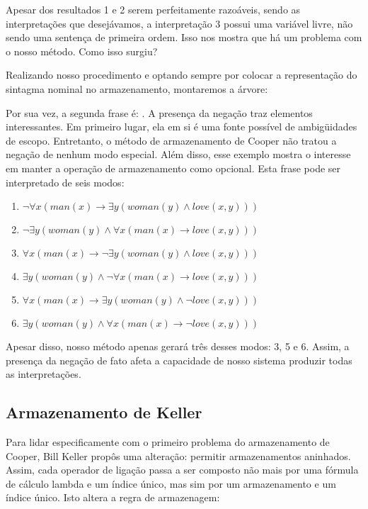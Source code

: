 Apesar dos resultados 1 e 2 serem perfeitamente razoáveis, sendo as interpretações que desejávamos, a interpretação 3 possui uma variável livre, não sendo uma sentença de primeira ordem. Isso nos mostra que há um problema com o nosso método. Como isso surgiu?

Realizando nosso procedimento e optando sempre por colocar a representação do sintagma nominal no armazenamento, montaremos a árvore: 


Por sua vez, a segunda frase é:  . A presença da negação traz elementos interessantes. Em primeiro lugar, ela em si é uma fonte possível de ambigüidades de escopo. Entretanto, o método de armazenamento de Cooper não tratou a negação de nenhum modo especial. Além disso, esse exemplo mostra o interesse em manter a operação de armazenamento como opcional. Esta frase pode ser interpretado de seis modos:
\begin{enumerate}
\item $\neg \forall x (man(x) \rightarrow \exists y (woman(y) \land love(x,y))) $
\item $\neg \exists y(woman(y) \land \forall x(man(x) \rightarrow love(x,y)))$
\item $\forall x (man(x) \rightarrow \neg \exists y (woman(y) \land love(x,y)))$
\item $\exists y(woman(y) \land \neg \forall x(man(x) \rightarrow love(x,y)))$
\item $\forall x (man(x) \rightarrow \exists y (woman(y) \land \neg love(x,y)))$
\item $\exists y(woman(y) \land \forall x(man(x) \rightarrow \neg love(x,y)))$
\end{enumerate}

Apesar disso, nosso método apenas gerará três desses modos: 3, 5 e 6. Assim, a presença da negação de fato afeta a capacidade de nosso sistema produzir todas as interpretações.

\subsection{Armazenamento de Keller}
Para lidar especificamente com o primeiro problema do armazenamento de Cooper, Bill Keller propôs uma alteração: permitir armazenamentos aninhados. Assim, cada operador de ligação passa a ser composto não mais por uma fórmula de cálculo lambda e um índice único, mas sim por um armazenamento e um índice único. Isto altera a regra de armazenagem:

